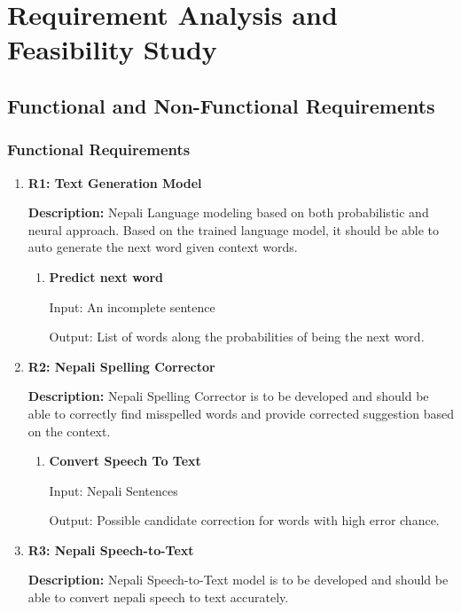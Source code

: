 \chapter{Requirement Analysis and Feasibility Study}
\section{Functional and Non-Functional Requirements}
\subsection{Functional Requirements}
\begin{enumerate}[font=\bfseries]
    \item \textbf{R1: Text Generation Model}

          \textbf{Description: }Nepali Language modeling based on both probabilistic and neural approach. Based on the trained language model, it should be able to auto generate the next word given context words.

          \begin{enumerate}
              \item \textbf{Predict next word}

                    Input: An incomplete sentence

                    Output: List of words along the probabilities of being the next word.
          \end{enumerate}
      
    \item \textbf{R2: Nepali Spelling Corrector}

    
          \textbf{Description: }Nepali Spelling Corrector is to be developed and should be able to correctly find misspelled words and provide corrected suggestion based on the context.

          \begin{enumerate}
            \item \textbf{Convert Speech To Text}
            
                  Input: Nepali Sentences
                  
                  Output: Possible candidate correction for words with high error chance. 
          \end{enumerate}

    \item \textbf{R3: Nepali Speech-to-Text}

    
          \textbf{Description: }Nepali Speech-to-Text model is to be developed and should be able to convert nepali speech to text accurately.


\end{enumerate}
